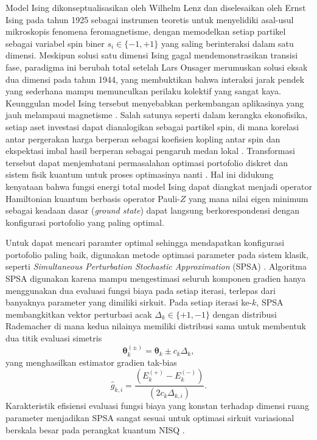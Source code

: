 Model Ising dikonseptualisasikan oleh Wilhelm Lenz dan diselesaikan oleh Ernst Ising pada tahun 1925 sebagai instrumen teoretis untuk menyelidiki asal-usul mikroskopis fenomena feromagnetisme, dengan memodelkan setiap partikel sebagai variabel spin biner $s_i \in \{-1,+1\}$ yang saling berinteraksi dalam satu dimensi. Meskipun solusi satu dimensi Ising gagal mendemonstrasikan transisi fase, paradigma ini berubah total setelah Lars Onsager merumuskan solusi eksak dua dimensi pada tahun 1944, yang membuktikan bahwa interaksi jarak pendek yang sederhana mampu memunculkan perilaku kolektif yang sangat kaya. Keunggulan model Ising tersebut menyebabkan perkembangan aplikasinya yang jauh melampaui magnetisme \cite{lucas_ising_2014}. Salah satunya seperti dalam kerangka ekonofisika, setiap aset investasi dapat dianalogikan sebagai partikel spin, di mana korelasi antar pergerakan harga berperan sebagai koefisien kopling antar spin dan ekspektasi imbal hasil berperan sebagai pengaruh medan lokal \cite{mantegna_introduction_2000}. Transformasi tersebut dapat menjembatani permasalahan optimasi portofolio diskret dan sistem fisik kuantum untuk proses optimasinya nanti \cite{galam_ising_2010}. Hal ini didukung kenyataan bahwa fungsi energi total model Ising dapat diangkat menjadi operator Hamiltonian kuantum berbasis operator Pauli-$Z$ yang mana nilai eigen minimum sebagai keadaan dasar (\textit{ground state}) dapat langsung berkorespondensi dengan konfigurasi portofolio yang paling optimal.

Untuk dapat mencari paramter optimal sehingga mendapatkan konfigurasi portofolio paling baik, digunakan metode optimasi parameter pada sistem klasik, seperti \textit{Simultaneous Perturbation Stochastic Approximation} (SPSA) \cite{spall_implementation_1998}. Algoritma SPSA digunakan karena mampu mengestimasi seluruh komponen gradien hanya menggunakan dua evaluasi fungsi biaya pada setiap iterasi, terlepas dari banyaknya parameter yang dimiliki sirkuit. Pada setiap iterasi ke-$k$, SPSA membangkitkan vektor perturbasi acak $\Delta_k \in \{+1,-1\}$ dengan distribusi Rademacher di mana kedua nilainya memiliki distribusi sama untuk membentuk dua titik evaluasi simetris 
\begin{equation}\boldsymbol{\theta}_k^{(\pm)} = \boldsymbol{\theta}_k \pm c_k\Delta_k,
\end{equation}
yang menghasilkan estimator gradien tak-bias
\begin{equation}
\hat{g}_{k,i} = \frac{(E_k^{(+)} - E_k^{(-)})}{(2c_k\Delta_{k,i})}. 
\end{equation}
Karakteristik efisiensi evaluasi fungsi biaya yang konstan terhadap dimensi ruang parameter menjadikan SPSA sangat sesuai untuk optimasi sirkuit variasional berskala besar pada perangkat kuantum NISQ \cite{preskill_quantum_2018}.

